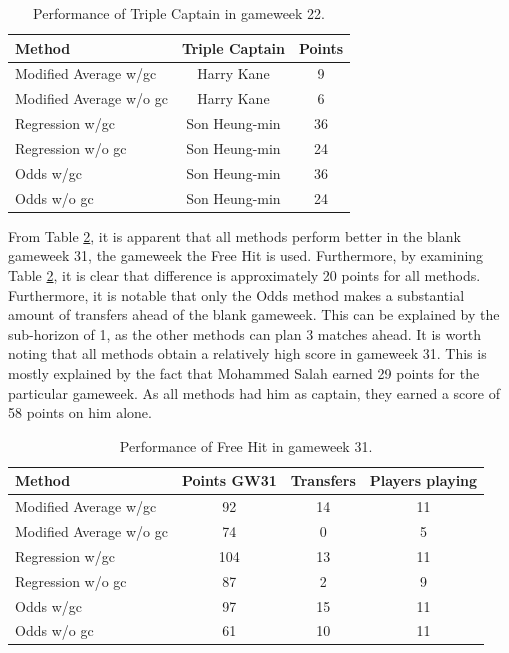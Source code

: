 \begin{table}[H]
\centering
\begin{tabular}{@{}lcc@{}}
\toprule
                 Method       & Triple Captain & Points \\ \midrule
Modified Average w/gc   & Harry Kane           & 9      \\
Modified Average w/o gc & Harry Kane           & 6      \\
Regression w/gc         & Son Heung-min            & 36     \\
Regression w/o gc       & Son Heung-min            & 24     \\
Odds w/gc               & Son Heung-min            & 36     \\
Odds w/o gc             & Son Heung-min            & 24     \\ \bottomrule
\end{tabular}
\caption{Performance of Triple Captain in gameweek 22.}
\label{tab:performance_triple_captain}
\end{table}

\newpar 

From Table \ref{tab:performance_free_hit}, it is apparent that all methods perform better in the blank gameweek 31, the gameweek the Free Hit is used. Furthermore, by examining Table \ref{tab:performance_free_hit}, it is clear that difference is approximately 20 points for all methods. Furthermore, it is notable that only the Odds method makes a substantial amount of transfers ahead of the blank gameweek. This can be explained by the sub-horizon of 1, as the other methods can plan 3 matches ahead. It is worth noting that all methods obtain a relatively high score in gameweek 31. This is mostly explained by the fact that Mohammed Salah earned 29 points for the particular gameweek. As all methods had him as captain, they earned a score of 58 points on him alone.

\begin{table}[ht]
\centering
\begin{tabular}{@{}lccc@{}}
\toprule
Method                  & Points GW31 & Transfers  & Players playing \\ \midrule
Modified Average w/gc   & 92          & 14         & 11              \\
Modified Average w/o gc & 74          & 0  & 5               \\
Regression w/gc         & 104         & 13         & 11              \\
Regression w/o gc       & 87          & 2  & 9               \\
Odds w/gc               & 97          & 15         & 11              \\
Odds w/o gc             & 61          & 10  & 11              \\ \bottomrule
\end{tabular}
\caption{Performance of Free Hit in gameweek 31.}
\label{tab:performance_free_hit}
\end{table}


